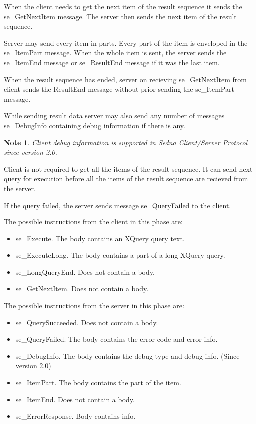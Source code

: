 \documentclass[a4paper,12pt]{article}
\newtheorem{note}{Note}
\begin{document}
When the client needs to get the next item of the result sequence it sends the se\_GetNextItem message. The server then sends the next item of the result sequence.

Server may send every item in parts. Every part of the item is enveloped in the se\_ItemPart message. When the whole item is sent, the server sends the se\_ItemEnd message or se\_ResultEnd message if it was the last item.

When the result sequence has ended, server on recieving se\_GetNextItem from client sends the ResultEnd message without prior sending the se\_ItemPart message.

While sending result data server may also send any number of messages se\_DebugInfo containing debug information if there is any.

\begin{note}
Client debug information is supported in Sedna Client/Server Protocol since version 2.0.
\end{note}

Client is not required to get all the items of the result sequence. It can send next query for execution before all the items of the result sequence are recieved from the server.

If the query failed, the server sends message se\_QueryFailed to the client.

The possible instructions from the client in this phase are:
\begin{itemize} 
\item se\_Execute. The body contains an XQuery query text.
\item se\_ExecuteLong. The body contains a part of a long XQuery query.
\item se\_LongQueryEnd. Does not contain a body.
\item se\_GetNextItem. Does not contain a body.
\end{itemize}

The possible instructions from the server in this phase are:
\begin{itemize} 
\item se\_QuerySucceeded. Does not contain a body.
\item se\_QueryFailed. The body contains the error code and error info.
\item se\_DebugInfo. The body contains the debug type and debug info. (Since version 2.0)
\item se\_ItemPart. The body contains the part of the item.
\item se\_ItemEnd. Does not contain a body.
\item se\_ErrorResponse. Body contains info.
\end{itemize}
\end{document}
